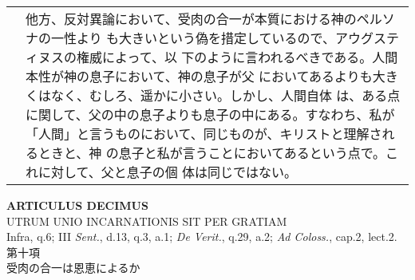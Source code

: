 \documentclass[10pt]{jsarticle} %
\begin{document}
\begin{longtable}{p{21em}p{21em}}
&

他方、反対異論において、受肉の合一が本質における神のペルソナの一性より
も大きいという偽を措定しているので、アウグスティヌスの権威によって、以
下のように言われるべきである。人間本性が神の息子において、神の息子が父
においてあるよりも大きくはなく、むしろ、遥かに小さい。しかし、人間自体
は、ある点に関して、父の中の息子よりも息子の中にある。すなわち、私が
「人間」と言うものにおいて、同じものが、キリストと理解されるときと、神
の息子と私が言うことにおいてあるという点で。これに対して、父と息子の個
体は同じではない。


\\




\end{longtable}
\newpage




\begin{center}
{\Large {\bf ARTICULUS DECIMUS}}\\ {\large UTRUM UNIO INCARNATIONIS
SIT PER GRATIAM}\\ {\footnotesize Infra, q.6; III {\itshape Sent.},
d.13, q.3, a.1; {\itshape De Verit.}, q.29, a.2; {\itshape Ad
Coloss.}, cap.2, lect.2.}\\ {\Large 第十項\\受肉の合一は恩恵によるか}
\end{center}
\end{document}
